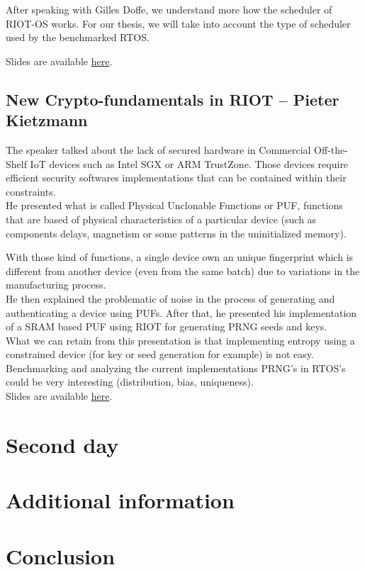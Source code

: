 \documentclass[journal, a4paper]{../IEEEtran}
\begin{document}
After speaking with Gilles Doffe, we understand more how the scheduler of RIOT-OS works.
For our thesis, we will take into account the type of scheduler used by the benchmarked RTOS.



Slides are available \href{http://summit.riot-os.org/2018/wp-content/uploads/sites/10/2018/09/2_1-Gille-Doffe-RIOT-Robot.pdf}{here}.

\subsection{New Crypto-fundamentals in RIOT -- Pieter Kietzmann}

The speaker talked about the lack of secured hardware in Commercial Off-the-Shelf IoT devices such as Intel SGX or ARM TrustZone.
Those devices require efficient security softwares implementations that can be contained within their constraints.\\

He presented what is called Physical Unclonable Functions or PUF, 
    functions that are based of physical characteristics of a particular device (such as components delays, magnetism or some patterns in the uninitialized memory).

With those kind of functions, a single device own an unique fingerprint which is different from another device (even from the same batch) due to variations in the manufacturing process. \\

He then explained the problematic of noise in the process of generating and authenticating a device using PUFs.
After that, he presented his implementation of a SRAM based PUF using RIOT for generating PRNG seeds and keys. \\

What we can retain from this presentation is that implementing entropy using a constrained device (for key or seed generation for example) is not easy. \\
Benchmarking and analyzing the current implementations PRNG's in RTOS's could be very interesting (distribution, bias, uniqueness). \\

Slides are available \href{http://summit.riot-os.org/2018/wp-content/uploads/sites/10/2018/09/3_2-Peter-Kietzmann-Crypto-Fundamentals.pdf}{here}.

\section{Second day}


\section{Additional information}



\section{Conclusion}
\end{document}
